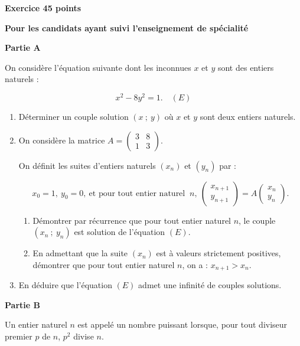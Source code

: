 \documentclass[10pt]{article}
\begin{document}
\textbf{Exercice 4\hfill 5 points}

\textbf{Pour les candidats ayant suivi l'enseignement de spécialité}

\bigskip

\textbf{Partie A}

\medskip

On considère l'équation suivante dont les inconnues $x$ et $y$ sont des entiers naturels :

\[x^2 - 8y^2 = 1 . \quad(E)\]

\medskip

\begin{enumerate}
\item Déterminer un couple solution $(x~;~y)$ où $x$ et $y$ sont deux entiers naturels.
\item  On considère la matrice $A = \begin{pmatrix}3&8\\1&3\end{pmatrix}$.

On définit les suites d'entiers naturels $\left(x_n\right)$ et $\left(y_n\right)$ par :

\[x_0 = 1,\: y_0 = 0,\: \text{et pour tout entier naturel }\:n,\: \begin{pmatrix}x_{n+1}\\y_{n+1}\end{pmatrix} = A\begin{pmatrix}x_{n}\\y_{n}\end{pmatrix}.\]
	\begin{enumerate}
		\item Démontrer par récurrence que pour tout entier naturel $n$, le couple 
		$\left(x_n~;~y_n\right)$ est solution de l'équation $(E)$.
		\item En admettant que la suite $\left(x_n\right)$ est à valeurs strictement positives, démontrer que pour tout entier naturel $n$, on a : $x_{n+1} > x_n$.
 	\end{enumerate}
\item  En déduire que l'équation $(E)$ admet une infinité de couples solutions.
\end{enumerate}

\bigskip

\textbf{Partie B}

\medskip

Un entier naturel $n$ est appelé un nombre puissant lorsque, pour tout diviseur premier $p$ de $n$,\: $p^2$ divise $n$.
\end{document}
